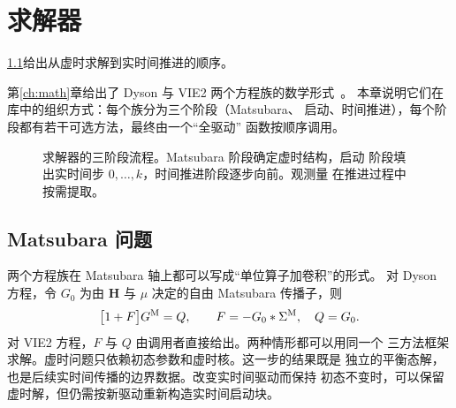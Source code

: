 \chapter{求解器}
\label{ch:solvers}

\cref{fig:solver-stages}给出从虚时求解到实时间推进的顺序。

第\ref{ch:math}章给出了 Dyson 与 VIE2 两个方程族的数学形式~\cite{aoki2014}。
本章说明它们在库中的组织方式：每个族分为三个阶段（Matsubara、
启动、时间推进），每个阶段都有若干可选方法，最终由一个“全驱动”
函数按顺序调用。

\begin{figure}[htbp]
    \centering
    \caption[求解器的三阶段流程]{求解器的三阶段流程。Matsubara 阶段确定虚时结构，启动
             阶段填出实时间步 $0,\ldots,k$，时间推进阶段逐步向前。观测量
             在推进过程中按需提取。}
    \label{fig:solver-stages}
\end{figure}

\section{Matsubara 问题}
\label{sec:matsubara-problem}

两个方程族在 Matsubara 轴上都可以写成“单位算子加卷积”的形式。
对 Dyson 方程，令 $G_0$ 为由 $\bm{H}$ 与 $\mu$ 决定的自由
Matsubara 传播子，则
\begin{equation}
    \big[1+F\big]G^{\mathrm{M}} = Q,
    \qquad F = -G_0 * \Sigma^{\mathrm{M}},\quad Q = G_0 .
    \label{eq:mat-dyson-operator}
\end{equation}
对 VIE2 方程，$F$ 与 $Q$ 由调用者直接给出。两种情形都可以用同一个
三方法框架求解。虚时问题只依赖初态参数和虚时核。这一步的结果既是
独立的平衡态解，也是后续实时间传播的边界数据。改变实时间驱动而保持
初态不变时，可以保留虚时解，但仍需按新驱动重新构造实时间启动块。


